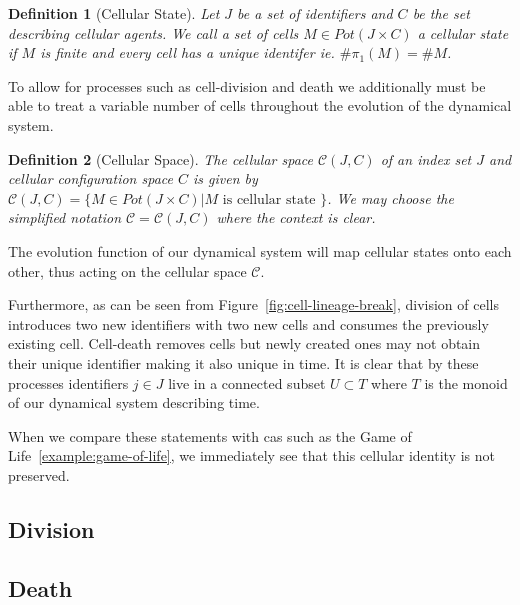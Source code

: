\documentclass{article}
\newtheorem{definition}{Definition}[section]
\begin{document}
\begin{definition}[Cellular State]
    Let $J$ be a set of identifiers and $C$ be the set describing cellular agents.
    We call a set of cells $M\in Pot(J\times C)$ a cellular state if $M$ is finite and every cell
    has a unique identifer ie. $\#\pi_1(M)=\#M$.
\end{definition}

To allow for processes such as cell-division and death we additionally must be able to treat a
variable number of cells throughout the evolution of the dynamical system.

\begin{definition}[Cellular Space]
    The cellular space $\mathscr{C}(J, C)$ of an index set $J$ and cellular configuration space $C$
    is given by $\mathscr{C}(J,C) = \{M\in Pot(J\times C) | M \text{ is cellular state }\}$.
    We may choose the simplified notation $\mathscr{C} = \mathscr{C}(J, C)$ where the context is
    clear.
\end{definition}

The evolution function of our dynamical system will map cellular states onto each other, thus
acting on the cellular space $\mathscr{C}$.

Furthermore, as can be seen from Figure~\ref{fig:cell-lineage-break}, division of cells introduces
two new identifiers with two new cells and consumes the previously existing cell.
Cell-death removes cells but newly created ones may not obtain their unique identifier making it
also unique in time.
It is clear that by these processes identifiers $j\in J$ live in a connected subset $U\subset T$
where $T$ is the monoid of our dynamical system describing time.

When we compare these statements with \acp{ca} such as the Game of Life~\ref{example:game-of-life},
we immediately see that this cellular identity is not preserved.

\subsection{Division}
\subsection{Death}
\end{document}
